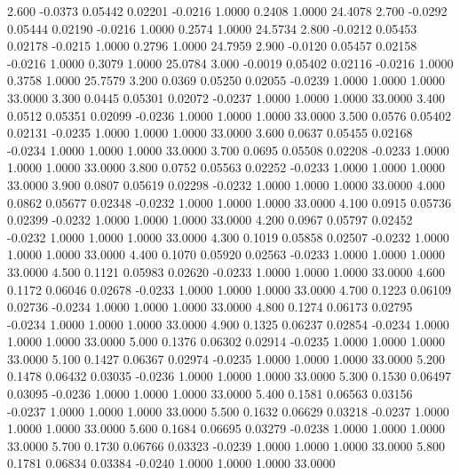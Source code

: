    2.600  -0.0373   0.05442   0.02201  -0.0216   1.0000   0.2408   1.0000  24.4078
   2.700  -0.0292   0.05444   0.02190  -0.0216   1.0000   0.2574   1.0000  24.5734
   2.800  -0.0212   0.05453   0.02178  -0.0215   1.0000   0.2796   1.0000  24.7959
   2.900  -0.0120   0.05457   0.02158  -0.0216   1.0000   0.3079   1.0000  25.0784
   3.000  -0.0019   0.05402   0.02116  -0.0216   1.0000   0.3758   1.0000  25.7579
   3.200   0.0369   0.05250   0.02055  -0.0239   1.0000   1.0000   1.0000  33.0000
   3.300   0.0445   0.05301   0.02072  -0.0237   1.0000   1.0000   1.0000  33.0000
   3.400   0.0512   0.05351   0.02099  -0.0236   1.0000   1.0000   1.0000  33.0000
   3.500   0.0576   0.05402   0.02131  -0.0235   1.0000   1.0000   1.0000  33.0000
   3.600   0.0637   0.05455   0.02168  -0.0234   1.0000   1.0000   1.0000  33.0000
   3.700   0.0695   0.05508   0.02208  -0.0233   1.0000   1.0000   1.0000  33.0000
   3.800   0.0752   0.05563   0.02252  -0.0233   1.0000   1.0000   1.0000  33.0000
   3.900   0.0807   0.05619   0.02298  -0.0232   1.0000   1.0000   1.0000  33.0000
   4.000   0.0862   0.05677   0.02348  -0.0232   1.0000   1.0000   1.0000  33.0000
   4.100   0.0915   0.05736   0.02399  -0.0232   1.0000   1.0000   1.0000  33.0000
   4.200   0.0967   0.05797   0.02452  -0.0232   1.0000   1.0000   1.0000  33.0000
   4.300   0.1019   0.05858   0.02507  -0.0232   1.0000   1.0000   1.0000  33.0000
   4.400   0.1070   0.05920   0.02563  -0.0233   1.0000   1.0000   1.0000  33.0000
   4.500   0.1121   0.05983   0.02620  -0.0233   1.0000   1.0000   1.0000  33.0000
   4.600   0.1172   0.06046   0.02678  -0.0233   1.0000   1.0000   1.0000  33.0000
   4.700   0.1223   0.06109   0.02736  -0.0234   1.0000   1.0000   1.0000  33.0000
   4.800   0.1274   0.06173   0.02795  -0.0234   1.0000   1.0000   1.0000  33.0000
   4.900   0.1325   0.06237   0.02854  -0.0234   1.0000   1.0000   1.0000  33.0000
   5.000   0.1376   0.06302   0.02914  -0.0235   1.0000   1.0000   1.0000  33.0000
   5.100   0.1427   0.06367   0.02974  -0.0235   1.0000   1.0000   1.0000  33.0000
   5.200   0.1478   0.06432   0.03035  -0.0236   1.0000   1.0000   1.0000  33.0000
   5.300   0.1530   0.06497   0.03095  -0.0236   1.0000   1.0000   1.0000  33.0000
   5.400   0.1581   0.06563   0.03156  -0.0237   1.0000   1.0000   1.0000  33.0000
   5.500   0.1632   0.06629   0.03218  -0.0237   1.0000   1.0000   1.0000  33.0000
   5.600   0.1684   0.06695   0.03279  -0.0238   1.0000   1.0000   1.0000  33.0000
   5.700   0.1730   0.06766   0.03323  -0.0239   1.0000   1.0000   1.0000  33.0000
   5.800   0.1781   0.06834   0.03384  -0.0240   1.0000   1.0000   1.0000  33.0000
